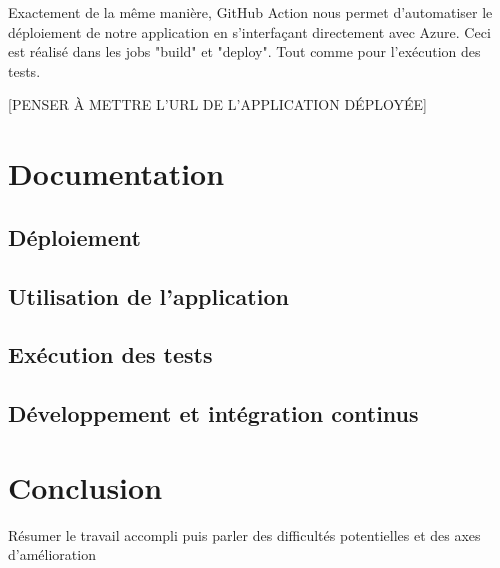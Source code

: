 \documentclass[french]{article}
\begin{document}
    Exactement de la même manière, GitHub Action nous permet d'automatiser le déploiement de notre application en s'interfaçant directement avec Azure. Ceci est réalisé dans les jobs "build" et "deploy". Tout comme pour l'exécution des tests. 

    [PENSER À METTRE L'URL DE L'APPLICATION DÉPLOYÉE]
    
    \section{Documentation}
    \subsection{Déploiement}
    \subsection{Utilisation de l'application}
    \subsection{Exécution des tests}
    \subsection{Développement et intégration continus}
    
    
    \newpage
    \section*{Conclusion}
    Résumer le travail accompli puis parler des difficultés potentielles et des axes d'amélioration
    
    


    
\end{document}
